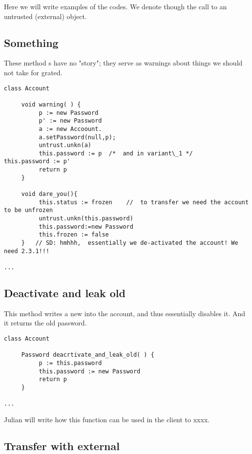 Here we will write examples of the codes. We denote though  the call to an untrusted (external) object.


\subsection{Something}

These  method s have no "story"; they serve  as warnings about things we should not take for grated.

\begin{lstlisting}[language=chainmail, mathescape=true, frame=lines]
class Account

     void warning( ) {
          p := new Password
          p' := new Password
          a := new Accoount.
          a.setPassword(null,p);
          untrust.unkn(a)
          this.password := p  /*  and in variant\_1 */     this.password := p' 
          return p    
     }
     
     void dare_you(){
          this.status := frozen    //  to transfer we need the account to be unfrozen 
          untrust.unkn(this.password)
          this.password:=new Password
          this.frozen := false
     }   // SD: hmhhh,  essentially we de-activated the account! We need 2.3.1!!!
     
...
\end{lstlisting}


\subsection*{Deactivate and leak old}

This method writes a new  into the account, and thus essentially disables it. And it returns the old password.

\begin{lstlisting}[language=chainmail, mathescape=true, frame=lines]
class Account

     Password deacrtivate_and_leak_old( ) {
          p := this.password
          this.password := new Password
          return p    
     }
     
...
\end{lstlisting}

Julian will write how this function can be used in the client to xxxx.

\subsection{Transfer with external}


